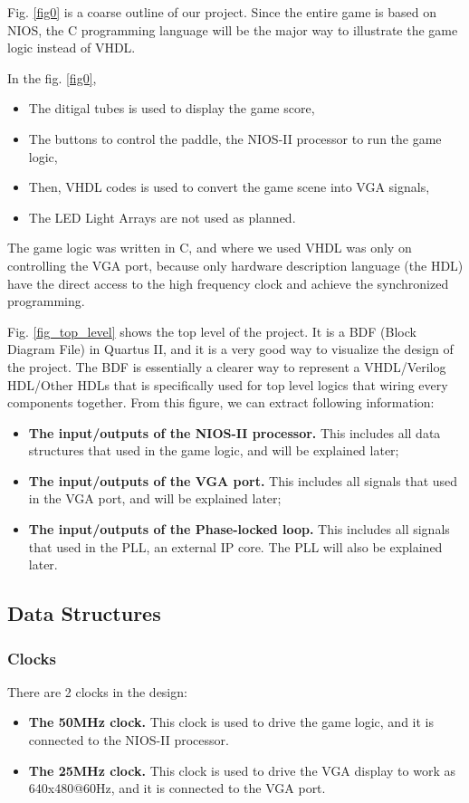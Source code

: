 \documentclass[conference]{IEEEtran}
\begin{document}
Fig. \ref{fig0} is a coarse outline of our project. Since the entire game is based on NIOS, the C programming language will be the major way to illustrate the game logic instead of VHDL.

In the fig. \ref{fig0}, 
\begin{itemize}
    \item The ditigal tubes is used to display the game score,
    \item The buttons to control the paddle, the NIOS-II processor to run the game logic,
    \item Then, VHDL codes is used to convert the game scene into VGA signals,
    \item The LED Light Arrays are not used as planned.
\end{itemize}

The game logic was written in C, and where we used VHDL was only on controlling the VGA port, because only hardware description language (the HDL) have the direct access to the high frequency clock and achieve the synchronized programming.

Fig. \ref{fig_top_level} shows the top level of the project. It is a BDF (Block Diagram File) in Quartus II, and it is a very good way to visualize the design of the project. The BDF is essentially a clearer way to represent a VHDL/Verilog HDL/Other HDLs that is specifically used for top level logics that wiring every components together. From this figure, we can extract following information:
\begin{itemize}
    \item \textbf{The input/outputs of the NIOS-II processor.} This includes all data structures that used in the game logic, and will be explained later;
    \item \textbf{The input/outputs of the VGA port.} This includes all signals that used in the VGA port, and will be explained later;
    \item \textbf{The input/outputs of the Phase-locked loop.} This includes all signals that used in the PLL, an external IP core. The PLL will also be explained later.
\end{itemize}

\subsection{Data Structures}
\subsubsection{Clocks}
There are 2 clocks in the design:
\begin{itemize}
    \item \textbf{The 50MHz clock.} This clock is used to drive the game logic, and it is connected to the NIOS-II processor.
    \item \textbf{The 25MHz clock.} This clock is used to drive the VGA display to work as 640x480@60Hz, and it is connected to the VGA port.
\end{itemize}
\end{document}
